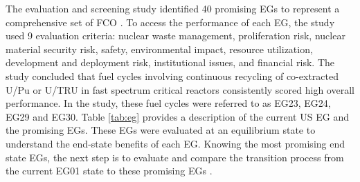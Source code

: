 The evaluation and screening study identified 40 promising 
\glspl{EG} to represent a comprehensive set of 
\gls{FCO} \cite{wigeland_nuclear_2014}. 
To access the performance of each \gls{EG}, the study
used 9 evaluation criteria: nuclear waste management, 
proliferation risk, nuclear material security risk, 
safety, environmental impact, resource utilization, 
development and deployment risk, institutional issues, and 
financial risk.  
The study concluded that fuel cycles
involving continuous recycling of co-extracted U/Pu or U/TRU in 
fast spectrum critical reactors consistently scored high overall 
performance.
In the study, these fuel cycles were referred to as EG23, EG24, 
EG29 and EG30. 
Table \ref{tab:eg} provides a description of the current 
\gls{US} \gls{EG} and the promising \glspl{EG}. 
These \glspl{EG} were evaluated at an equilibrium state to 
understand the end-state benefits of each \gls{EG}.
Knowing the most promising end state \glspl{EG}, 
the next step is to evaluate and compare the transition process 
from the current EG01 
state to these promising \glspl{EG} \cite{feng_standardized_2016}. 
